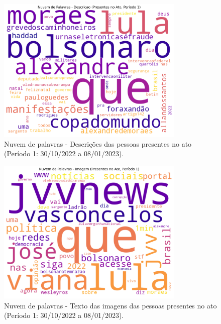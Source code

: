 \documentclass[manuscript,screen,review]{acmart}
\begin{document}
\begin{figure}[h]
\centering
\includegraphics[width=0.8\textwidth]{figura21_nuvem_presentes_desc_periodo1.png}
\caption{Nuvem de palavras - Descrições das pessoas presentes no ato (Período 1: 30/10/2022 a 08/01/2023).}
\label{fig:figura21}
\end{figure}

\begin{figure}[h]
\centering
\includegraphics[width=0.8\textwidth]{figura22_nuvem_presentes_img_periodo1.png}
\caption{Nuvem de palavras - Texto das imagens das pessoas presentes no ato (Período 1: 30/10/2022 a 08/01/2023).}
\label{fig:figura22}
\end{figure}
\end{document}
